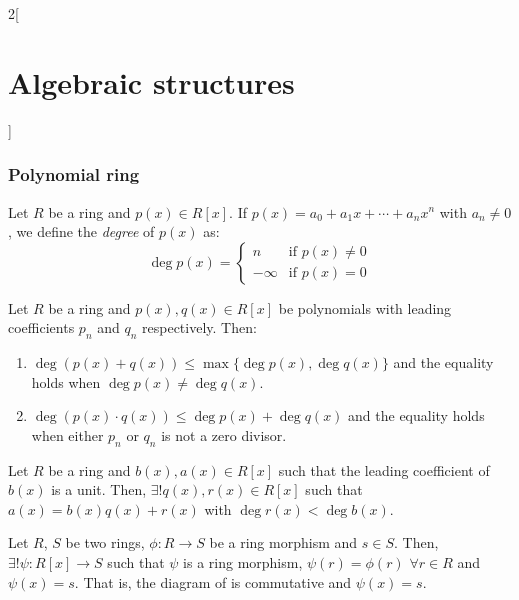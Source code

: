 \documentclass[../../../main_math.tex]{subfiles}
\begin{document}
\begin{multicols}{2}[\section{Algebraic structures}]
  \subsubsection{Polynomial ring}
  \begin{definition}
    Let $R$ be a ring and $p(x)\in R[x]$. If $p(x)=a_0+a_1x+\cdots+a_nx^n$ with $a_n\ne 0$, we define the \emph{degree} of $p(x)$ as:
    \begin{equation*}
      \deg p(x)=
      \begin{cases}
        n       & \text{if }p(x)\ne 0 \\
        -\infty & \text{if }p(x)= 0
      \end{cases}
    \end{equation*}
  \end{definition}
  \begin{proposition}\label{AS:deg}
    Let $R$ be a ring and $p(x),q(x)\in R[x]$ be polynomials with leading coefficients $p_n$ and $q_n$ respectively. Then:
    \begin{enumerate}
      \item $\deg(p(x)+q(x))\leq\max\{\deg p(x),\deg q(x)\}$ and the equality holds when $\deg p(x)\ne\deg q(x)$.
      \item $\deg(p(x)\cdot q(x))\leq\deg p(x)+\deg q(x)$ and the equality holds when either $p_n$ or $q_n$ is not a zero divisor.
    \end{enumerate}
  \end{proposition}
  \begin{proposition}
    Let $R$ be a ring and $b(x),a(x)\in R[x]$ such that the leading coefficient of $b(x)$ is a unit. Then, $\exists! q(x),r(x)\in R[x]$ such that $a(x)=b(x)q(x)+r(x)$ with $\deg r(x)<\deg b(x)$.
  \end{proposition}
  \begin{proposition}
    Let $R$, $S$ be two rings, $\phi:R\rightarrow S$ be a ring morphism and $s\in S$. Then, $\exists!\psi:R[x]\rightarrow S$ such that $\psi$ is a ring morphism, $\psi(r)=\phi(r)$ $\forall r\in R$ and $\psi(x)=s$. That is, the diagram of  is commutative and $\psi(x)=s$.
    \begin{center}
      \begin{minipage}{\linewidth}
        \centering
        
        \label{AS:theorem3}
      \end{minipage}
    \end{center}

\end{proposition}
\end{multicols}
\end{document}

